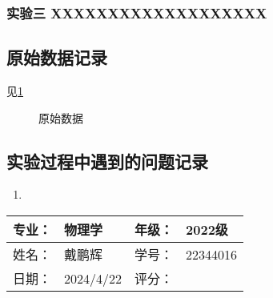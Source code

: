 \documentclass[dvipsnames, svgnames,a4paper,11pt]{article}
\begin{document}
	\subsubsection{实验三 \quad XXXXXXXXXXXXXXXXXXX}










\subsection{原始数据记录}

	见\cref{fig:data}

	\begin{figure}[htbp]
		\centering
		\quad
		\quad
		\quad
		\quad

		\caption{原始数据}
		\label{fig:data}
	\end{figure}



\subsection{实验过程中遇到的问题记录}

\begin{enumerate}
	\item 
	
\end{enumerate}
	

\clearpage
\begin{table}
	\renewcommand\arraystretch{1.7}
	\begin{tabularx}{\textwidth}{|X|X|X|X|}
	\hline
	专业：& 物理学 &年级：& 2022级\\
	\hline
	姓名： & 戴鹏辉 & 学号：& 22344016\\
	\hline
    日期：& 2024/4/22 & 评分： &\\
	\hline
	\end{tabularx}
\end{table}
\end{document}
